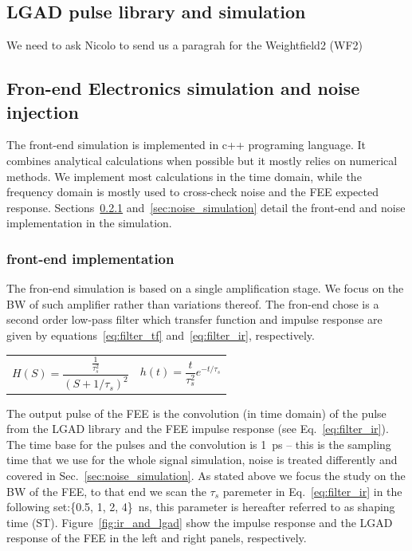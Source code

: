 \documentclass[preprint,1p]{elsarticle}
\begin{document}
\subsection{LGAD pulse library and simulation}
\label{sub_sec:lgad_pulse_library}
We need to ask Nicolo to send us a paragrah for the Weightfield2 (WF2)

\subsection{Fron-end Electronics simulation and noise injection}
\label{sub_sec:fee_simulation_and_noise}
The front-end simulation is implemented in c++ programing language. It combines analytical calculations when possible but
it mostly relies on numerical methods. We implement most calculations in the time domain, while the frequency domain is mostly used
to cross-check noise and the FEE expected response. Sections~\ref{sec:fee} and~\ref{sec:noise_simulation} detail the front-end and
noise implementation in the simulation.

\subsubsection{front-end implementation}\label{sec:fee}
The fron-end simulation is based on a single amplification stage. We focus on the BW of such amplifier rather than variations
thereof. The fron-end chose is a second order low-pass filter which transfer function
and impulse response are given by equations~\ref{eq:filter_tf} and~\ref{eq:filter_ir}, respectively.


 \begin{tabularx}{\textwidth}{XX}
 \begin{equation}\label{eq:filter_tf}
   H(S) = \frac{\frac{1}{\tau_{s}^{2}}}{(S+1/\tau_{s})^{2}}
 \end{equation}
     &
 \begin{equation}\label{eq:filter_ir}
     h(t) = \frac{t}{\tau_s^2}e^{-t/\tau_{s}}
 \end{equation}
 \end{tabularx}\par

 The output pulse of the FEE is the convolution (in time domain) of the pulse from the LGAD library and the FEE impulse response
 (see Eq.~\ref{eq:filter_ir}).
 The time base for the pulses and the convolution is 1~\si{ps} -- this is the sampling time that we use for the whole
 signal simulation, noise is treated differently and covered in Sec.~\ref{sec:noise_simulation}. As stated above we focus the study
 on the BW of the FEE, to that end we scan the $\tau_{s}$ paremeter in Eq.~\ref{eq:filter_ir} in the following set:\{0.5, 1, 2, 4\}~\si{ns}, this parameter is hereafter referred to as
 shaping time (ST). Figure~\ref{fig:ir_and_lgad} show the impulse response and the LGAD response of the FEE in the left and right panels,
 respectively. 
\end{document}

